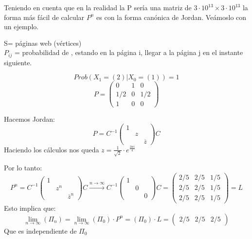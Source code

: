 Teniendo en cuenta que en la realidad la P sería una matriz de $3\cdot 10^{13} \times 3\cdot 10^{13}$ la forma más fácil de calcular $P^n$ es con la forma canónica de Jordan. Veámoslo con un ejemplo.
\begin{example}[1]{}



	\begin{center}
	\centering
\end{center}


	S= páginas web (vértices)\\
	$P_{ij}$ = probabilidad de , estando en la página i, llegar a la página j en el instante siguiente.

	$$Prob(X_1 = (2)| X_0 = (1)) = 1$$
	$$P =\left(\begin{matrix}
	0 & 1 & 0\\
	1/2 & 0 & 1/2\\
	1 & 0 & 0
	\end{matrix}\right)$$

	Hacemos Jordan:
	$$P = C^{-1} \left(\begin{matrix}
	1&&\\
	&z&\\
	&&\overline{z}
	\end{matrix}\right) C$$
	Haciendo los cálculos nos queda $z = \frac{1}{\sqrt{2}}\cdot e^{\frac{3\pi i}{4}}$

	Por lo tanto:
	$$P^n =  C^{-1} \left(\begin{matrix}
	1&&\\
	&z^n&\\
	&&\overline{z}^n
	\end{matrix}\right) C \stackrel{n\rightarrow \infty}{\rightarrow}  C^{-1} \left(\begin{matrix}
	1&&\\
	&0&\\
	&&0
	\end{matrix}\right) C = \left(\begin{matrix}
	2/5&2/5&1/5\\
	2/5&2/5&1/5\\
	2/5&2/5&1/5
	\end{matrix}\right) = L$$
	Esto implica que:
	$$\lim_{n\rightarrow\infty}\left(\Pi_n\right) = \lim_{n\rightarrow\infty}\left(\Pi_0\right)\cdot P^n = \left(\Pi_0\right)\cdot L =( \begin{matrix}
	2/5&2/5&2/5
	\end{matrix})$$
	Que es independiente de $\Pi_0$
\end{example}

